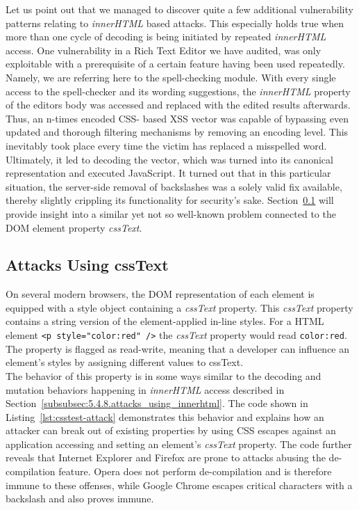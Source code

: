      Let us point out that we managed to discover quite a few additional vulnerability patterns relating to \textit{innerHTML} based attacks.  This especially holds true when more than one cycle of decoding is being initiated by repeated \textit{innerHTML} access. One vulnerability in a Rich Text Editor we have audited, was only exploitable with a prerequisite of a certain feature having been used repeatedly. Namely, we are referring here to the spell-checking module. With every single access to the spell-checker and its wording suggestions, the \textit{innerHTML} property of the editors body was accessed and replaced with the edited results afterwards. Thus, an n-times encoded CSS- based XSS vector was capable of bypassing even updated and thorough filtering mechanisms by removing an encoding level. This inevitably took place every time the victim has replaced a misspelled word. Ultimately, it led to decoding the vector, which was turned into its canonical representation and executed JavaScript. It turned 
out that in this particular situation, the server-side removal of backslashes was a solely valid fix available, thereby slightly crippling its functionality for security's sake. Section~\ref{subsubsec:5.4.9.attacks_using_csstext} will provide insight into a similar yet not so well-known problem connected to the DOM element property \textit{cssText}.
    
    \subsection{Attacks Using cssText}
    \label{subsubsec:5.4.9.attacks_using_csstext}

     On several modern browsers, the DOM representation of each element is equipped with a style object containing a \textit{cssText} property. This \textit{cssText} property contains a string version of the element-applied in-line styles. For a HTML element \texttt{<p style="color:red" />} the \textit{cssText} property would read \texttt{color:red}. The property is flagged as read-write, meaning that a developer can influence an element's styles by assigning different values to cssText.\\

     The behavior of this property is in some ways similar to the decoding and mutation behaviors happening in \textit{innerHTML} access described in Section~\ref{subsubsec:5.4.8.attacks_using_innerhtml}. The code shown in Listing~\ref{lst:csstest-attack} demonstrates this behavior and explains how an attacker can break out of existing properties by using CSS escapes against an application accessing and setting an element's \textit{cssText} property. The code further reveals that Internet Explorer and Firefox are prone to attacks abusing the de-compilation feature. Opera does not perform de-compilation and is therefore immune to these offenses, while Google Chrome escapes critical characters with a backslash and also proves immune. 

